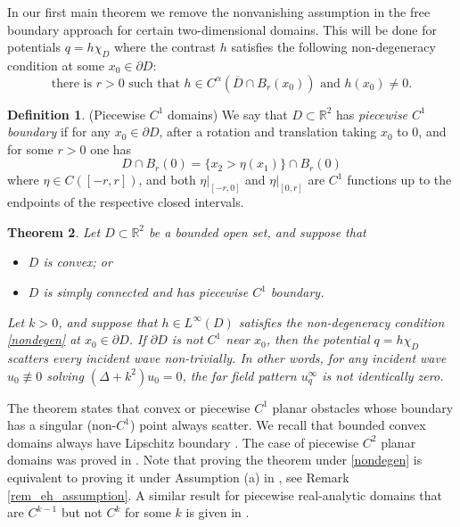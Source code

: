 \documentclass[11pt,a4paper]{amsart}
\newtheorem{Theorem}{Theorem}[section]
\theoremstyle{definition}
\newtheorem{Definition}[Theorem]{Definition}
\numberwithin{equation}{section}
\newcommand{\mR}{\mathbb{R}}                    %
\newcommand{\ol}[1]{\overline{#1}}
\newcommand{\p}{\partial}
\begin{document}
In our first main theorem we remove the nonvanishing assumption in the free boundary approach for certain two-dimensional domains. This will be done for potentials $q = h \chi_D$ where the contrast $h$ satisfies the following non-degeneracy condition at some $x_0 \in \p D$:
\begin{equation} \label{nondegen}
\text{there is $r > 0$ such that $h \in C^{\alpha}(\ol{D} \cap B_r(x_0))$ and $h(x_0) \neq 0$}.
\end{equation}

\begin{Definition}\label{piecewise-C1}(Piecewise $C^1$ domains)
We say that $D \subset \mR^2$ has \emph{piecewise $C^1$ boundary} if for any $x_0 \in \p D$, after a rotation and translation taking $x_0$ to $0$, and for some $r > 0$ one has 
\[
D \cap B_r(0) = \{ x_2 > \eta(x_1) \} \cap B_r(0)
\]
where $\eta \in C([-r,r])$, and both $\eta|_{[-r,0]}$ and $\eta|_{[0,r]}$ are $C^1$ functions up to the endpoints of the respective closed intervals.
\end{Definition}

\begin{Theorem} \label{thm_main_twodim}
Let $D \subset \mR^2$ be a bounded open set, and suppose that 
\begin{itemize}
\item 
$D$ is convex; or 
\item 
$D$ is  simply connected and has piecewise $C^1$ boundary.
\end{itemize}
Let $k > 0$, and suppose that $h \in L^{\infty}(D)$ satisfies the non-degeneracy condition \eqref{nondegen} at $x_0 \in \p D$. If $\p D$ is not $C^1$ near $x_0$, then the potential $q = h \chi_D$ scatters every incident wave non-trivially. In other words, for any incident wave $u_0 \not\equiv 0$ solving $(\Delta+k^2)u_0=0$, the far field pattern $u_q^{\infty}$ is not identically zero.
\end{Theorem}



The theorem states that convex or piecewise $C^1$ planar obstacles whose boundary has a singular (non-$C^1$) point always scatter. We recall that bounded convex domains always have Lipschitz boundary \cite[Corollary 1.2.2.3]{Grisvard}.
The case of piecewise $C^2$ planar domains was proved in \cite{ElschnerHu2}. Note that proving the theorem under \eqref{nondegen} is equivalent to proving it under Assumption (a) in \cite{ElschnerHu2}, see Remark \ref{rem_eh_assumption}. A similar result for piecewise real-analytic domains that are $C^{k-1}$ but not $C^k$ for some $k$ is given in \cite{LiHuYang2023}.
\end{document}
